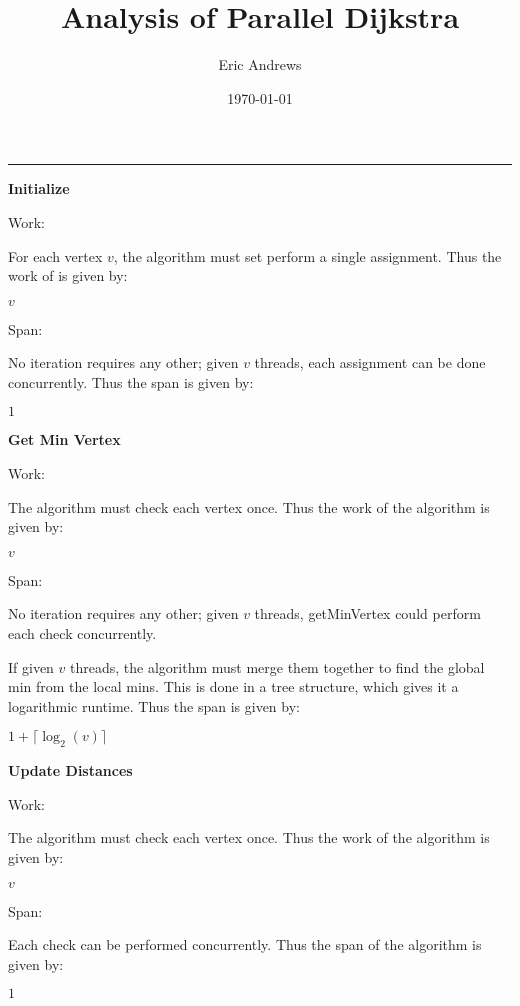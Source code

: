 \documentclass[12pt]{article}
\begin{document}
\title{Analysis of Parallel Dijkstra}
\author{Eric Andrews}
\date{\today}
\pagestyle{fancy}
\maketitle
\onehalfspacing

\rule{\textwidth}{.1pt}
\vspace*{.75cm}

\centerline{\textbf{Initialize}}

\noindent Work:

For each vertex $v$, the algorithm must set perform a single assignment. Thus the
work of is given by:

\centerline{$v$}

\noindent Span:

No iteration requires any other; given $v$ threads, each assignment can be done
concurrently. Thus the span is given by:

\centerline{$1$}

\vspace{.75cm}

\centerline{\textbf{Get Min Vertex}}

\noindent Work:

The algorithm must check each vertex once. Thus the work of the algorithm is given
by:

\centerline{$v$}

\noindent Span:

No iteration requires any other; given $v$ threads, getMinVertex could perform
each check concurrently.

If given $v$ threads, the algorithm must merge them together to find the global min
from the local mins. This is done in a tree structure, which gives it a
logarithmic runtime. Thus the span is given by:

\centerline{$1 + \lceil\log_{2}(v)\rceil$}

\newpage

\centerline{\textbf{Update Distances}}

\noindent Work:

The algorithm must check each vertex once. Thus the work of the algorithm is given
by:

\centerline{$v$}

\noindent Span:

Each check can be performed concurrently. Thus the span of the algorithm is given
by:

\centerline{$1$}
\end{document}
